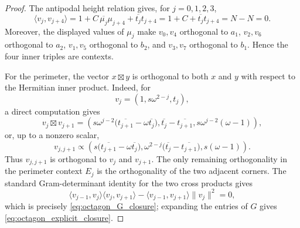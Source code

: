 \documentclass[
  twocolumn,
  aps,
  pra,
  floatfix,
  amsmath,amssymb,
  longbibliography
]{revtex4-2}
\theoremstyle{definition}
\theoremstyle{remark}
\begin{document}
\begin{proof}
The antipodal height relation gives, for \(j=0,1,2,3\),
\[
  \langle v_j,v_{j+4}\rangle
  =1+C\,\overline{\mu_j}\mu_{j+4}+\overline{t_j}t_{j+4}
  =1+C+\overline{t_j}t_{j+4}
  =N-N
  =0 .
\]
Moreover, the displayed values of \(\mu_j\) make \(v_0,v_4\)
orthogonal to \(a_1\), \(v_2,v_6\) orthogonal to \(a_2\),
\(v_1,v_5\) orthogonal to \(b_2\), and \(v_3,v_7\) orthogonal to
\(b_1\).  Hence the four inner triples are contexts.

For the perimeter, the vector \(x\boxtimes y\) is orthogonal
to both \(x\) and \(y\) with respect to the Hermitian inner product.
Indeed, for
\[
  v_j=(1,s\omega^{2-j},t_j),
\]
a direct computation gives
\[
  v_j\boxtimes v_{j+1}
  =
  \left(
    s\omega^{j-2}
    \bigl(\overline{t_{j+1}}-\omega\overline{t_j}\bigr),
    \overline{t_j}-\overline{t_{j+1}},
    s\omega^{j-2}(\omega-1)
  \right),
\]
or, up to a nonzero scalar,
\[
  v_{j,j+1}
  \propto
  \left(
    s\bigl(\overline{t_{j+1}}-\omega\overline{t_j}\bigr),
    \omega^{2-j}\bigl(\overline{t_j}-\overline{t_{j+1}}\bigr),
    s(\omega-1)
  \right).
\]
Thus \(v_{j,j+1}\) is orthogonal to \(v_j\) and \(v_{j+1}\).  The only
remaining orthogonality in the perimeter context \(E_j\) is the
orthogonality of the two adjacent corners.  The standard Gram-determinant
identity for the two cross products gives
\[
  \langle v_{j-1},v_j\rangle
  \langle v_j,v_{j+1}\rangle
  -
  \langle v_{j-1},v_{j+1}\rangle
  \|v_j\|^2
  =0,
\]
which is precisely \eqref{eq:octagon_G_closure}; expanding the entries
of \(G\) gives \eqref{eq:octagon_explicit_closure}.
\end{proof}
\end{document}
